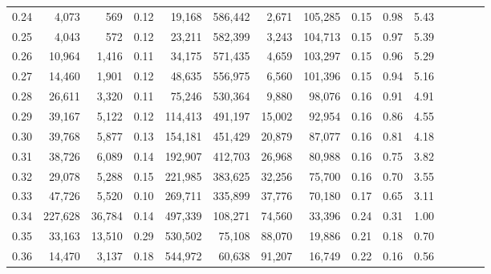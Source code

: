 \begin{tabular}{rrrcrrrrrrrrrrr}
0.24 &    4,073 &     569 &                                       0.12 &   19,168 &  586,442 &    2,671 &  105,285 &  0.15 &  0.98 &                         5.43 \\
0.25 &    4,043 &     572 &                                       0.12 &   23,211 &  582,399 &    3,243 &  104,713 &  0.15 &  0.97 &                         5.39 \\
0.26 &   10,964 &   1,416 &                                       0.11 &   34,175 &  571,435 &    4,659 &  103,297 &  0.15 &  0.96 &                         5.29 \\
0.27 &   14,460 &   1,901 &                                       0.12 &   48,635 &  556,975 &    6,560 &  101,396 &  0.15 &  0.94 &                         5.16 \\
0.28 &   26,611 &   3,320 &                                       0.11 &   75,246 &  530,364 &    9,880 &   98,076 &  0.16 &  0.91 &                         4.91 \\
0.29 &   39,167 &   5,122 &                                       0.12 &  114,413 &  491,197 &   15,002 &   92,954 &  0.16 &  0.86 &                         4.55 \\
0.30 &   39,768 &   5,877 &                                       0.13 &  154,181 &  451,429 &   20,879 &   87,077 &  0.16 &  0.81 &                         4.18 \\
0.31 &   38,726 &   6,089 &                                       0.14 &  192,907 &  412,703 &   26,968 &   80,988 &  0.16 &  0.75 &                         3.82 \\
0.32 &   29,078 &   5,288 &                                       0.15 &  221,985 &  383,625 &   32,256 &   75,700 &  0.16 &  0.70 &                         3.55 \\
0.33 &   47,726 &   5,520 &                                       0.10 &  269,711 &  335,899 &   37,776 &   70,180 &  0.17 &  0.65 &                         3.11 \\
0.34 &  227,628 &  36,784 &                                       0.14 &  497,339 &  108,271 &   74,560 &   33,396 &  0.24 &  0.31 &                         1.00 \\
0.35 &   33,163 &  13,510 &                                       0.29 &  530,502 &   75,108 &   88,070 &   19,886 &  0.21 &  0.18 &                         0.70 \\
0.36 &   14,470 &   3,137 &                                       0.18 &  544,972 &   60,638 &   91,207 &   16,749 &  0.22 &  0.16 &                         0.56 \\

\end{tabular}
